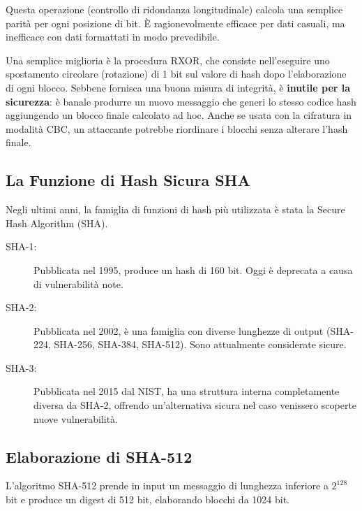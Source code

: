 Questa operazione (controllo di ridondanza longitudinale) calcola una semplice parità per ogni posizione di bit. È ragionevolmente efficace per dati casuali, ma inefficace con dati formattati in modo prevedibile.

Una semplice miglioria è la procedura RXOR, che consiste nell'eseguire uno spostamento circolare (rotazione) di 1 bit sul valore di hash dopo l'elaborazione di ogni blocco. Sebbene fornisca una buona misura di integrità, è \textbf{inutile per la sicurezza}: è banale produrre un nuovo messaggio che generi lo stesso codice hash aggiungendo un blocco finale calcolato ad hoc. Anche se usata con la cifratura in modalità CBC, un attaccante potrebbe riordinare i blocchi senza alterare l'hash finale.






\subsection{La Funzione di Hash Sicura SHA}
Negli ultimi anni, la famiglia di funzioni di hash più utilizzata è stata la Secure Hash Algorithm (SHA).
\begin{description}
    \item[SHA-1:] Pubblicata nel 1995, produce un hash di 160 bit. Oggi è deprecata a causa di vulnerabilità note.
    \item[SHA-2:] Pubblicata nel 2002, è una famiglia con diverse lunghezze di output (SHA-224, SHA-256, SHA-384, SHA-512). Sono attualmente considerate sicure.
    \item[SHA-3:] Pubblicata nel 2015 dal NIST, ha una struttura interna completamente diversa da SHA-2, offrendo un'alternativa sicura nel caso venissero scoperte nuove vulnerabilità.
\end{description}

\subsection{Elaborazione di SHA-512}
L'algoritmo SHA-512 prende in input un messaggio di lunghezza inferiore a $2^{128}$ bit e produce un digest di 512 bit, elaborando blocchi da 1024 bit.



